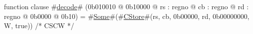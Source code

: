 function clause #\hyperref[zdecode]{decode}# (0b010010 @ 0b10000 @ rs : regno @ cb : regno @ rd : regno @ 0b0000 @ 0b10) = #\hyperref[zSome]{Some}#(#\hyperref[zCStore]{CStore}#(rs, cb, 0b00000, rd, 0b00000000, W, true)) /* CSCW */
